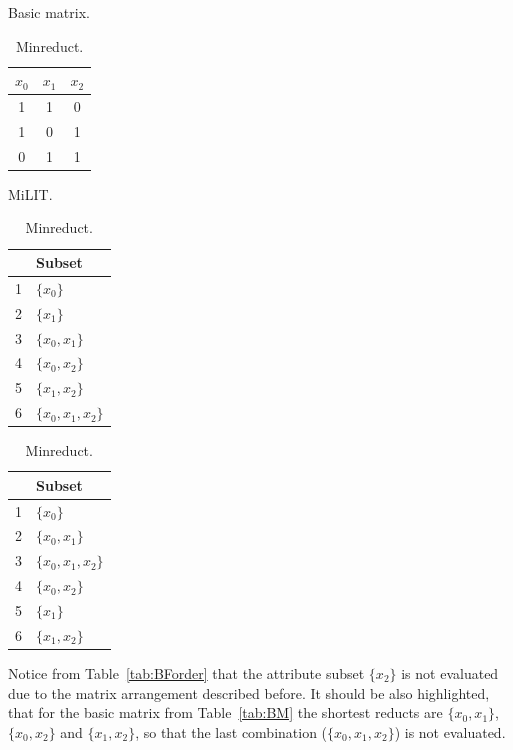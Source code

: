 \documentclass[citenumber]{llncs}
\begin{document}
	\begin{table}[htb]
		\begin{minipage}[t]{.3\linewidth}
			\small
			\caption{Basic matrix.}
			\centering
			\begin{tabular}{ccc}\label{tab:BM}
				$x_0$ & $x_1$ & $x_2$\\
				\hline
				1 & 1 & 0 \\
				1 & 0 & 1 \\
				0 & 1 & 1 \\
				
			\end{tabular}     
		\end{minipage}%
		\begin{minipage}[t]{.3\linewidth}
			\small
			\caption{MiLIT.}
			\centering
			\begin{tabular}{ll}\label{tab:BForder}
				 & Subset\\
				\hline
				1 & $\{x_0\}$ \\
				2 & $\{x_1\}$ \\
				3 & $\{x_0,x_1\}$ \\
				4 & $\{x_0,x_2\}$ \\
				5 & $\{x_1,x_2\}$ \\
				6 & $\{x_0,x_1,x_2\}$ \\
			\end{tabular}     
		\end{minipage}%
		\begin{minipage}[t]{.3\linewidth}   
			\small
			\caption{Minreduct.}
			\centering
			\begin{tabular}{ll}\label{tab:LGForder}
				 & Subset\\
				\hline
				1 & $\{x_0\}$ \\
				2 & $\{x_0,x_1\}$ \\ 
				3 & $\{x_0,x_1,x_2\}$ \\
				4 & $\{x_0,x_2\}$ \\
				5 & $\{x_1\}$ \\
				6 & $\{x_1,x_2\}$ \\
			\end{tabular}  
		\end{minipage}%
	\end{table}  

	Notice from Table~\ref{tab:BForder} that the attribute subset $\{x_2\}$	is not evaluated due to the matrix arrangement described before. It should be also highlighted, that for the basic matrix from Table~\ref{tab:BM} the shortest reducts are $\{x_0,x_1\}$, $\{x_0,x_2\}$ and $\{x_1,x_2\}$, so that the last combination ($\{x_0,x_1,x_2\}$) is not evaluated.
	
\end{document}

